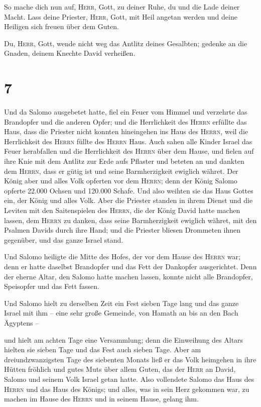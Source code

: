  So mache dich nun auf, \textsc{Herr}, Gott, zu deiner
Ruhe, du und die Lade deiner Macht. Lass deine Priester, \textsc{Herr},
Gott, mit Heil angetan werden und deine Heiligen sich freuen über dem
Guten.

 Du, \textsc{Herr}, Gott, wende nicht weg das Antlitz
deines Gesalbten; gedenke an die Gnaden, deinem Knechte David verheißen.

\hypertarget{section-6}{%
\section{7}\label{section-6}}

 Und da Salomo ausgebetet hatte, fiel ein Feuer vom Himmel
und verzehrte das Brandopfer und die anderen Opfer; und die Herrlichkeit
des \textsc{Herrn} erfüllte das Haus,  dass die Priester
nicht konnten hineingehen ins Haus des \textsc{Herrn}, weil die
Herrlichkeit des \textsc{Herrn} füllte des \textsc{Herrn} Haus.
 Auch sahen alle Kinder Israel das Feuer herabfallen und
die Herrlichkeit des \textsc{Herrn} über dem Hause, und fielen auf ihre
Knie mit dem Antlitz zur Erde aufs Pflaster und beteten an und dankten
dem \textsc{Herrn}, dass er gütig ist und seine Barmherzigkeit ewiglich
währet.  Der König aber und alles Volk opferten vor dem
\textsc{Herrn};  denn der König Salomo opferte 22.000
Ochsen und 120.000 Schafe. Und also weihten sie das Haus Gottes ein, der
König und alles Volk.  Aber die Priester standen in ihrem
Dienst und die Leviten mit den Saitenspielen des \textsc{Herrn}, die der
König David hatte machen lassen, dem \textsc{Herrn} zu danken, dass
seine Barmherzigkeit ewiglich währet, mit den Psalmen Davids durch ihre
Hand; und die Priester bliesen Drommeten ihnen gegenüber, und das ganze
Israel stand.

 Und Salomo heiligte die Mitte des Hofes, der vor dem
Hause des \textsc{Herrn} war; denn er hatte daselbst Brandopfer und das
Fett der Dankopfer ausgerichtet. Denn der eherne Altar, den Salomo hatte
machen lassen, konnte nicht alle Brandopfer, Speisopfer und das Fett
fassen.

 Und Salomo hielt zu derselben Zeit ein Fest sieben Tage
lang und das ganze Israel mit ihm -- eine sehr große Gemeinde, von
Hamath an bis an den Bach Ägyptens --

 und hielt am achten Tage eine Versammlung; denn die
Einweihung des Altars hielten sie sieben Tage und das Fest auch sieben
Tage.  Aber am dreiundzwanzigsten Tage des siebenten
Monats ließ er das Volk heimgehen in ihre Hütten fröhlich und gutes Muts
über allem Guten, das der \textsc{Herr} an David, Salomo und seinem Volk
Israel getan hatte.  Also vollendete Salomo das Haus des
\textsc{Herrn} und das Haus des Königs; und alles, was in sein Herz
gekommen war, zu machen im Hause des \textsc{Herrn} und in seinem Hause,
gelang ihm.

